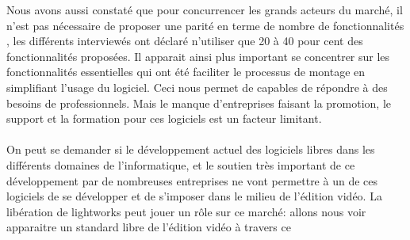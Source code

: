 Nous avons aussi constaté que pour concurrencer les grands acteurs du
marché, il n'est pas nécessaire de proposer une parité en terme de
nombre de fonctionnalités , les différents interviewés ont déclaré
n'utiliser que 20 à 40 pour cent des fonctionnalités proposées. Il
apparait ainsi plus important se concentrer sur les fonctionnalités
essentielles qui ont été %
faciliter le processus de montage en simplifiant l'usage du logiciel. Ceci
nous permet de %
capables de répondre à des besoins de professionnels.  Mais le manque
d'entreprises faisant la promotion, le support et la formation pour ces
logiciels est un facteur limitant.

\paragraph{}

On peut se demander si le développement actuel des logiciels libres
dans les différents domaines de l'informatique, et le soutien très
important de ce développement par de nombreuses entreprises ne vont %
permettre à un de ces logiciels de se développer et de s'imposer dans
le milieu de l'édition vidéo.  La libération de lightworks peut jouer
un rôle sur ce marché: allons nous voir apparaitre un standard libre
de l'édition vidéo à travers ce %

